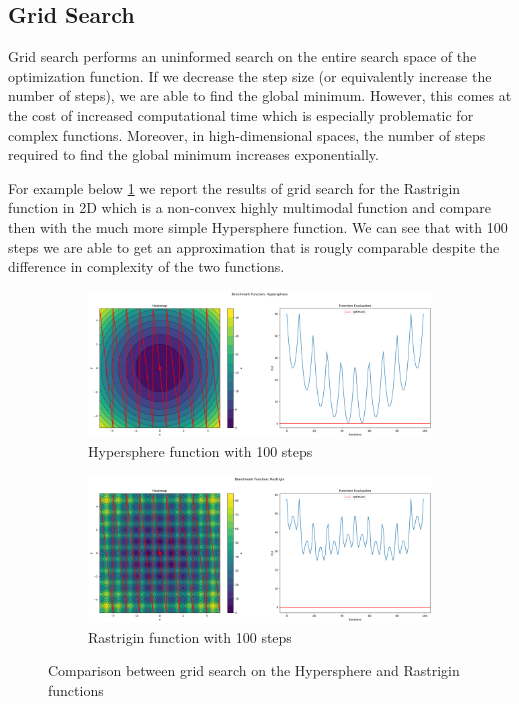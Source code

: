 \subsection{Grid Search}
\label{sec:grid-search}

Grid search performs an uninformed search on the entire search space of the optimization function. If we decrease the step size (or equivalently increase the number of steps), we are able to find the global minimum. However, this comes at the cost of increased computational time which is especially problematic for complex functions. Moreover, in high-dimensional spaces, the number of steps required to find the global minimum increases exponentially.

For example below \ref{fig:gs-100} we report the results of grid search for the Rastrigin function in 2D which is a non-convex highly multimodal function and compare then with the much more simple Hypersphere function. We can see that with 100 steps we are able to get an approximation that is rougly comparable despite the difference in complexity of the two functions.
\begin{figure}[H]
    \begin{subfigure}{0.5\textwidth}
        \includegraphics[width=\textwidth]{lab1/imgs/gs_sphere_100.png}
        \caption{Hypersphere function with 100 steps}
    \end{subfigure}
    \begin{subfigure}{0.5\textwidth}
        \includegraphics[width=\textwidth]{lab1/imgs/gs_rastrigin_100.png}
        \caption{Rastrigin function with 100 steps}
    \end{subfigure}
    \caption{Comparison between grid search on the Hypersphere and Rastrigin functions}
    \label{fig:gs-100}
\end{figure}

